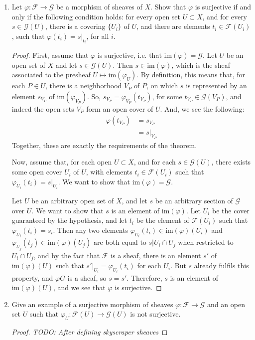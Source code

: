 \documentclass[12pt]{article}
\theoremstyle{definition}
\newenvironment{problem}[2][Problem]{\begin{trivlist}
\item[\hskip \labelsep {\bfseries #1}\hskip \labelsep {\bfseries #2.}]}{\end{trivlist}}
\begin{document}
\begin{problem}{3}
\begin{enumerate}[label=(\alph*)]
    \item Let $\varphi: \mathcal F \to \mathcal G$ be a morphism of sheaves of $X$. Show that $\varphi$ is surjective if and only if the following condition holds: for every open set $U \subset X$, and for every $s \in \mathcal G(U)$, there is a covering $\{U_i\}$ of $U$, and there are elements $t_i \in \mathcal F(U_i)$, such that $\varphi(t_i) = s\lvert_{t_i}$, for all $i$.
    \begin{proof}
    First, assume that $\varphi$ is surjective, i.e. that $\text{im}(\varphi) = \mathcal G$. Let $U$ be an open set of $X$ and let $s \in \mathcal G(U)$. Then $s \in \text{im}(\varphi)$, which is the sheaf associated to the presheaf $U \mapsto \text{im}(\varphi_U)$. By definition, this means that, for each $P \in U$, there is a neighborhood $V_P$ of $P$, on which $s$ is represented by an element $s_{V_P}$ of $\text{im}(\varphi_{V_P})$. So, $s_{V_P} = \varphi_{V_P}(t_{V_P})$, for some $t_{V_P} \in \mathcal G(V_P)$, and indeed the open sets $V_P$ form an open cover of $U$. And, we see the following:
    \begin{align*}
        \varphi(t_{V_P}) &= s_{V_P}\\
        &= s\lvert_{V_P}
    \end{align*}
    Together, these are exactly the requirements of the theorem.
    \par Now, assume that, for each open $U \subset X$, and for each $s \in \mathcal G(U)$, there exists some open cover $U_i$ of $U$, with elements $t_i \in \mathcal F(U_i)$ such that $\varphi_{U_i}(t_i) = s\lvert_{U_i}$. We want to show that $\text{im}(\varphi) = \mathcal G$. 
    \par Let $U$ be an arbitrary open set of $X$, and let $s$ be an arbitrary section of $\mathcal G$ over $U$. We want to show that $s$ is an element of $\text{im}(\varphi)$. Let $U_i$ be the cover guaranteed by the hypothesis, and let $t_i$ be the element of $\mathcal F(U_i)$ such that $\varphi_{U_i}(t_i) = s_i$. Then any two elements $\varphi_{U_i}(t_i) \in \text{im}(\varphi)(U_i)$ and $\varphi_{U_j}(t_j) \in \text{im}(\varphi)(U_j)$ are both equal to $s\lvert{U_i \cap U_j}$ when restricted to $U_i \cap U_j$, and by the fact that $\mathcal F$ is a sheaf, there is an element $s'$ of $\text{im}(\varphi)(U)$ such that $s'\lvert_{U_i} = \varphi_{U_i}(t_i)$ for each $U_i$. But $s$ already fulfils this property, and $\varphi G$ is a sheaf, so $s = s'$. Therefore, $s$ is an element of $\text{im}(\varphi)(U)$, and we see that $\varphi$ is surjective.
    \end{proof}
    \item Give an example of a surjective morphism of sheaves $\varphi: \mathcal F \to \mathcal G$ and an open set $U$ such that $\varphi_U: \mathcal F(U) \to \mathcal G(U)$ is not surjective.
    \begin{proof}
        \textit{TODO: After defining skyscraper sheaves}
    \end{proof}
\end{enumerate}
\end{problem}
\end{document}
